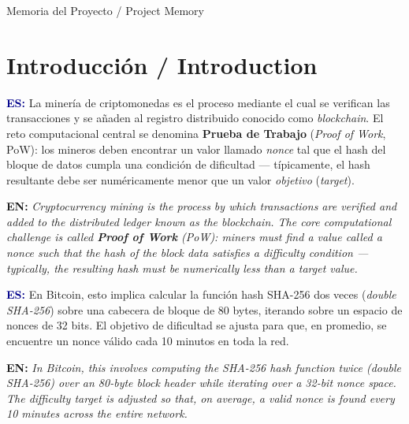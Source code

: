 \documentclass[12pt,a4paper]{article}
\newcommand{\bsection}[2]{%
    \section{#1 \textnormal{\normalsize\color{accentblue}/ #2}}%
}
\newenvironment{bilingual}{%
    \par\medskip
}{%
    \par\medskip
}
\newcommand{\espara}[1]{\noindent\textcolor{darkblue}{\textbf{ES:}} #1\par\smallskip}
\newcommand{\enpara}[1]{\noindent\textcolor{accentblue}{\textbf{EN:}} \textit{#1}\par\smallskip}
\begin{document}
\begin{titlepage}
\begin{center}
        \vfill

        \noindent\colorbox{medblue}{%
            \parbox{\dimexpr\textwidth-2\fboxsep}{%
                \centering\color{white}\normalsize
                \vspace{0.3cm}
                Memoria del Proyecto / Project Memory
                \vspace{0.3cm}
            }%
        }
    \end{center}
\end{titlepage}

\tableofcontents
\newpage

\bsection{Introducci\'on}{Introduction}

\begin{bilingual}
\espara{%
La miner\'ia de criptomonedas es el proceso mediante el cual se verifican las
transacciones y se a\~naden al registro distribuido conocido como \textit{blockchain}.
El reto computacional central se denomina \textbf{Prueba de Trabajo} (\textit{Proof of Work},
PoW): los mineros deben encontrar un valor llamado \textit{nonce} tal que el hash
del bloque de datos cumpla una condici\'on de dificultad --- t\'ipicamente, el hash
resultante debe ser num\'ericamente menor que un valor \textit{objetivo} (\textit{target}).}

\enpara{%
Cryptocurrency mining is the process by which transactions are verified
and added to the distributed ledger known as the blockchain.
The core computational challenge is called \textbf{Proof of Work} (PoW):
miners must find a value called a nonce such that the hash of the block
data satisfies a difficulty condition --- typically, the resulting hash
must be numerically less than a target value.}
\end{bilingual}

\begin{bilingual}
\espara{%
En Bitcoin, esto implica calcular la funci\'on hash SHA-256 dos veces
(\textit{double SHA-256}) sobre una cabecera de bloque de 80 bytes, iterando
sobre un espacio de nonces de 32 bits. El objetivo de dificultad se ajusta
para que, en promedio, se encuentre un nonce v\'alido cada 10 minutos en toda
la red.}

\enpara{%
In Bitcoin, this involves computing the SHA-256 hash function twice
(double SHA-256) over an 80-byte block header while iterating over a
32-bit nonce space. The difficulty target is adjusted so that, on average,
a valid nonce is found every 10 minutes across the entire network.}
\end{bilingual}
\end{document}
